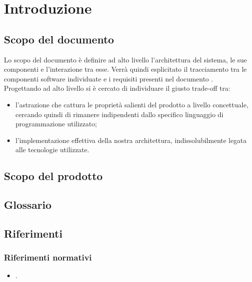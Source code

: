 \newpage
\section{Introduzione}
	\subsection {Scopo del documento}
	Lo scopo del documento è definire ad alto livello l'architettura del sistema, le sue componenti e l'interazione tra esse. Verrà quindi esplicitato il tracciamento tra le componenti software individuate e i requisiti presenti nel documento \adrv.
	\\Progettando ad alto livello si è cercato di individuare il giusto trade-off tra:
	\begin{itemize}
		\item l'astrazione che cattura le proprietà salienti del prodotto a livello concettuale, cercando quindi di rimanere indipendenti dallo specifico linguaggio di programmazione utilizzato;
		\item l'implementazione effettiva della nostra architettura, indissolubilmente legata alle tecnologie utilizzate.
	\end{itemize}
	
	\subsection {Scopo del prodotto}
	\introScopo
	\subsection {Glossario}
	\introGlossario
	\subsection {Riferimenti}
	\subsubsection{Riferimenti normativi}
	\begin{itemize}
		\item \ndpv.
	\end{itemize}
